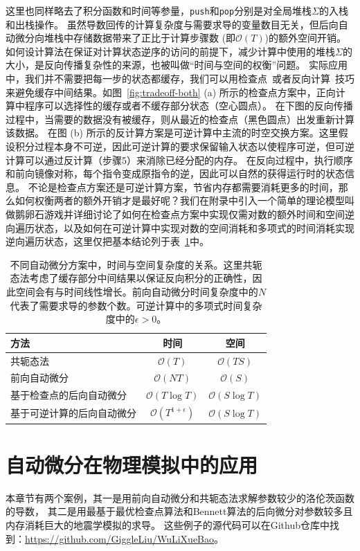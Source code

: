 \documentclass[A4,twoside,UTF8]{ctexart}
\newcommand{\bigO}{{\mathcal{O}}}
\begin{document}
这里也同样略去了积分函数和时间等参量，\texttt{push}和\texttt{pop}分别是对全局堆栈$\Sigma$的入栈和出栈操作。
虽然导数回传的计算复杂度与需要求导的变量数目无关，但后向自动微分向堆栈中存储数据带来了正比于计算步骤数 (即$\bigO(T)$)的额外空间开销。
如何设计算法在保证对计算状态逆序的访问的前提下，减少计算中使用的堆栈$\Sigma$的大小，是反向传播复杂性的来源，也被叫做“时间与空间的权衡”问题。
实际应用中，我们并不需要把每一步的状态都缓存，我们可以用检查点~\cite{Griewank1992}或者反向计算~\cite{Liu2020b}技巧来避免缓存中间结果。如图~\ref{fig:tradeoff-both} (a) 所示的检查点方案中，正向计算中程序可以选择性的缓存或者不缓存部分状态（空心圆点）。
在下图的反向传播过程中，当需要的数据没有被缓存，则从最近的检查点（黑色圆点）出发重新计算该数据。
在图 (b) 所示的反计算方案是可逆计算中主流的时空交换方案。这里假设积分过程本身不可逆，因此可逆计算的要求保留输入状态以使程序可逆，但可逆计算可以通过反计算（步骤5）来消除已经分配的内存。
在反向过程中，执行顺序和前向镜像对称，每个指令变成原指令的逆，因此可以自然的获得运行时的状态信息。
不论是检查点方案还是可逆计算方案，节省内存都需要消耗更多的时间，那么如何权衡两者的额外开销才是最好呢？我们在附录中引入一个简单的理论模型叫做鹅卵石游戏并详细讨论了如何在检查点方案中实现仅需对数的额外时间和空间逆向遍历状态，以及如何在可逆计算中实现对数的空间消耗和多项式的时间消耗实现逆向遍历状态，这里仅把基本结论列于表~\ref{tbl:complexity}中。

\begin{table}\centering
    \begin{tabularx}{0.7\textwidth}{Xcc}\toprule
        \textbf{方法} & 时间 & 空间\\
        \hline
        共轭态法                    &  $\bigO(T)$          & $\bigO(TS)$\\
        前向自动微分                 &  $\bigO(NT)$         & $\bigO(S)$  \\
        基于检查点的后向自动微分     &  $\bigO(T\log T)$    & $\bigO(S\log T)$   \\
        基于可逆计算的后向自动微分   &  $\bigO(T^{1+\epsilon})$ & $\bigO(S\log T)$ \\
        \bottomrule
    \end{tabularx}
    \caption{不同自动微分方案中，时间与空间复杂度的关系。这里共轭态法考虑了缓存部分中间结果以保证反向积分的正确性，因此空间会有与时间线性增长。前向自动微分时间复杂度中的$N$代表了需要求导的参数个数。可逆计算中的多项式时间复杂度中的$\epsilon > 0$。} \label{tbl:complexity}
\end{table}


\section{自动微分在物理模拟中的应用}\label{sec:applications}
本章节有两个案例，其一是用前向自动微分和共轭态法求解参数较少的洛伦茨函数的导数，
其二是用最基于最优检查点算法和Bennett算法的后向微分对参数较多且内存消耗巨大的地震学模拟的求导。
这些例子的源代码可以在Github仓库中找到：\href{https://github.com/GiggleLiu/WuLiXueBao}{https://github.com/GiggleLiu/WuLiXueBao}。
\end{document}
